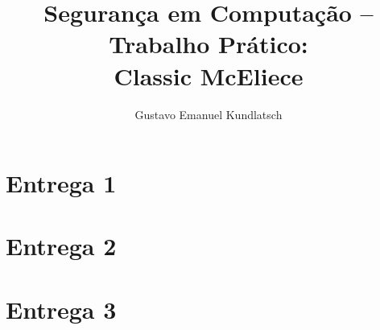 \documentclass[12pt]{article}
\title{Segurança em Computação -- Trabalho Prático:\\ Classic McEliece}
\author{Gustavo Emanuel Kundlatsch\inst{1}}
\begin{document}
 

\maketitle

\chapter{Entrega 1}
 
\newpage

\chapter{Entrega 2}

\newpage

\chapter{Entrega 3}

\newpage



\newpage

% 
\end{document}
